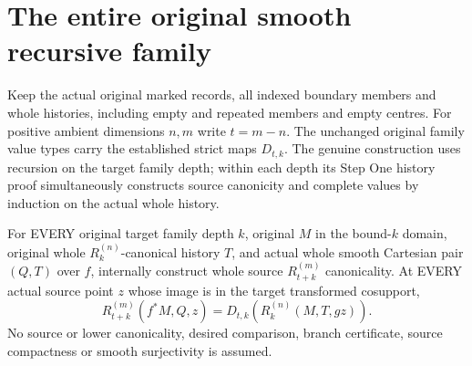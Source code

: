 \section{The entire original smooth recursive family}

Keep the actual original marked records, all indexed boundary members and
whole histories, including empty and repeated members and empty centres.
For positive ambient dimensions $n,m$ write $t=m-n$. The unchanged
original family value types carry the established strict maps $D_{t,k}$.
The genuine construction uses recursion on the target family depth; within
each depth its Step One history proof simultaneously constructs source
canonicity and complete values by induction on the actual whole history.

\begin{theorem}
\label{hir:smooth-original-recursive-family-values-canonical}
\leanok
{}
For EVERY original target family depth $k$, original $M$ in the bound-$k$
domain, original whole $R^{(n)}_k$-canonical history $T$, and actual whole
smooth Cartesian pair $(Q,T)$ over $f$, internally construct whole source
$R^{(m)}_{t+k}$ canonicality. At EVERY actual source point $z$ whose image
is in the target transformed cosupport,
\[
 R^{(m)}_{t+k}(f^*M,Q,z)=D_{t,k}(R^{(n)}_k(M,T,gz)).
\]
No source or lower canonicality, desired comparison, branch certificate,
source compactness or smooth surjectivity is assumed.
\end{theorem}
